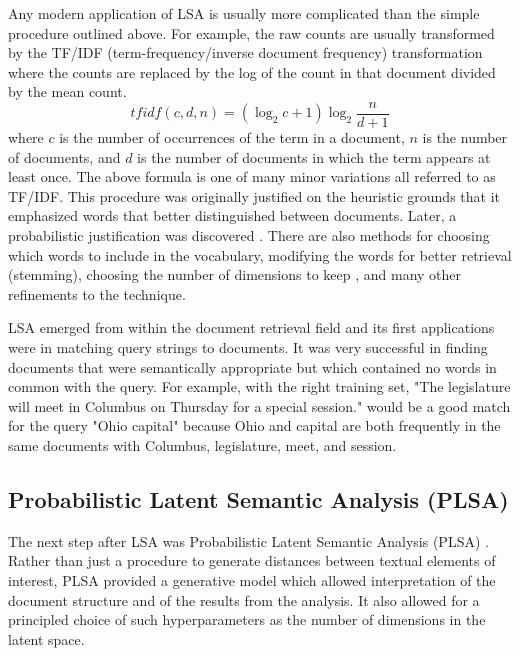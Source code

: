Any modern application of LSA is usually more complicated than the simple 
procedure outlined above. For example, the raw 
counts are usually transformed by the TF/IDF (term-frequency/inverse document 
frequency) transformation where the counts are replaced by the log of the count 
in that document divided by the mean count. 
%
\[tfidf(c,d,n)=\left(\log_2{c+1}\right) \log_2{\frac{n}{d+1}}\]
%
where $c$ is the number of occurrences of the term in a document, $n$ is the 
number of documents, and $d$ is the number of documents in which the term 
appears at least once. The above formula is one of many minor variations 
all referred to as TF/IDF. This procedure was originally justified on the 
heuristic grounds that it emphasized words that better distinguished 
between documents. 
Later, a probabilistic justification was discovered \citep{Hiemstra2000}. There 
are also methods for choosing which words to include in the vocabulary, 
modifying the words for better retrieval (stemming), 
choosing the number of dimensions to keep \citep{Fernandes2011}, and many other 
refinements to the technique.

LSA emerged from within the document retrieval field and its first applications were in 
matching query strings to documents. It was very successful in finding documents 
that were semantically appropriate but which contained no words in common with 
the query. For example, with the right training set, "The legislature will meet 
in Columbus on Thursday for a special session." would be a good match for the 
query "Ohio capital" because Ohio and capital are both frequently in the same 
documents with Columbus, legislature, meet, and session.

\subsection{Probabilistic Latent Semantic Analysis (PLSA)}

The next step after LSA was Probabilistic Latent Semantic Analysis (PLSA) 
\citep{Hofmann1999}. Rather than just a 
procedure to generate distances between textual elements of interest, PLSA 
provided a generative model which allowed interpretation of the document 
structure and of the results from the analysis. It also allowed for a principled
choice of such hyperparameters as the number of dimensions in the latent space.

